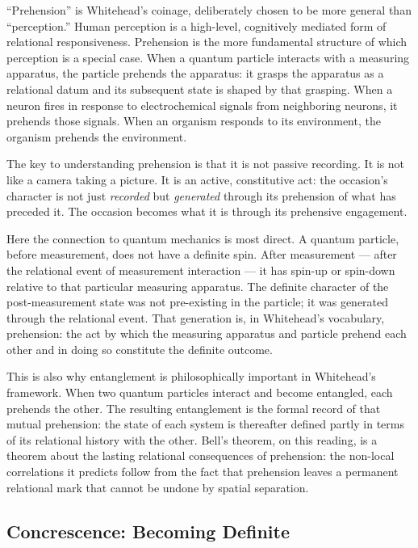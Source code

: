 ``Prehension'' is Whitehead's coinage, deliberately chosen to be more general than ``perception.'' Human perception is a high-level, cognitively mediated form of relational responsiveness. Prehension is the more fundamental structure of which perception is a special case. When a quantum particle interacts with a measuring apparatus, the particle prehends the apparatus: it grasps the apparatus as a relational datum and its subsequent state is shaped by that grasping. When a neuron fires in response to electrochemical signals from neighboring neurons, it prehends those signals. When an organism responds to its environment, the organism prehends the environment.

The key to understanding prehension is that it is not passive recording. It is not like a camera taking a picture. It is an active, constitutive act: the occasion's character is not just \emph{recorded} but \emph{generated} through its prehension of what has preceded it. The occasion becomes what it is through its prehensive engagement.

Here the connection to quantum mechanics is most direct. A quantum particle, before measurement, does not have a definite spin. After measurement --- after the relational event of measurement interaction --- it has spin-up or spin-down relative to that particular measuring apparatus. The definite character of the post-measurement state was not pre-existing in the particle; it was generated through the relational event. That generation is, in Whitehead's vocabulary, prehension: the act by which the measuring apparatus and particle prehend each other and in doing so constitute the definite outcome.

This is also why entanglement is philosophically important in Whitehead's framework. When two quantum particles interact and become entangled, each prehends the other. The resulting entanglement is the formal record of that mutual prehension: the state of each system is thereafter defined partly in terms of its relational history with the other. Bell's theorem, on this reading, is a theorem about the lasting relational consequences of prehension: the non-local correlations it predicts follow from the fact that prehension leaves a permanent relational mark that cannot be undone by spatial separation.

\subsection*{Concrescence: Becoming Definite}


